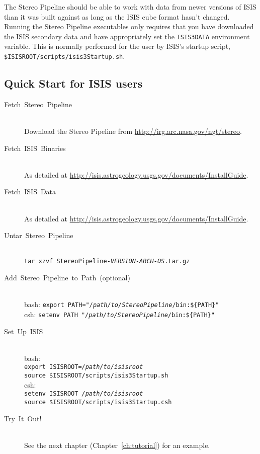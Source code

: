 \begin{description}
The Stereo Pipeline should be able to work with data from newer
versions of ISIS than it was built against as long as the ISIS cube
format hasn't changed. Running the Stereo Pipeline executables only
requires that you have downloaded the ISIS secondary data and have
appropriately set the \texttt{ISIS3DATA} environment variable. This
is normally performed for the user by ISIS's startup script,
\texttt{\$ISISROOT/scripts/isis3Startup.sh}.

\end{description}

\subsection{Quick Start for ISIS users}
\begin{description}

\item[{Fetch~Stereo~Pipeline}] ~\\
Download the Stereo Pipeline from \url{http://irg.arc.nasa.gov/ngt/stereo}.

\item [{Fetch~ISIS~Binaries}] ~\\
As detailed at \url{http://isis.astrogeology.usgs.gov/documents/InstallGuide}.

\item [{Fetch~ISIS~Data}] ~\\
As detailed at \url{http://isis.astrogeology.usgs.gov/documents/InstallGuide}.

\item [{Untar~Stereo~Pipeline}] ~\\
\texttt{tar xzvf StereoPipeline-\textit{VERSION-ARCH-OS}.tar.gz}

\item [{Add~Stereo~Pipeline~to~Path~(optional)}] ~\\
bash: \texttt{export PATH="\textit{/path/to/StereoPipeline}/bin:\$\{PATH\}"} \\
csh:  \texttt{setenv PATH "\textit{/path/to/StereoPipeline}/bin:\$\{PATH\}"}

\item[Set~Up~ISIS] ~\\
bash: \\
\hspace*{2em}\texttt{export ISISROOT=\textit{/path/to/isisroot}} \\
\hspace*{2em}\texttt{source \$ISISROOT/scripts/isis3Startup.sh} \\
csh: \\
\hspace*{2em}\texttt{setenv ISISROOT \textit{/path/to/isisroot}} \\
\hspace*{2em}\texttt{source \$ISISROOT/scripts/isis3Startup.csh}

\item [{Try~It~Out!}] ~\\
See the next chapter (Chapter~\ref{ch:tutorial}) for an example.
\end{description}

